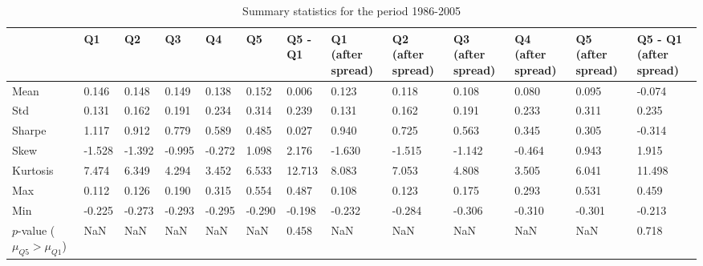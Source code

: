 \begin{table}
\caption{Summary statistics for the period 1986-2005}
\label{tab:summary_1986_2005}
\begin{tabular}{lllllllllllll}
\toprule
 & Q1 & Q2 & Q3 & Q4 & Q5 & Q5 - Q1 & Q1 (after spread) & Q2 (after spread) & Q3 (after spread) & Q4 (after spread) & Q5 (after spread) & Q5 - Q1 (after spread) \\
\midrule
Mean & 0.146 & 0.148 & 0.149 & 0.138 & 0.152 & 0.006 & 0.123 & 0.118 & 0.108 & 0.080 & 0.095 & -0.074 \\
Std & 0.131 & 0.162 & 0.191 & 0.234 & 0.314 & 0.239 & 0.131 & 0.162 & 0.191 & 0.233 & 0.311 & 0.235 \\
Sharpe & 1.117 & 0.912 & 0.779 & 0.589 & 0.485 & 0.027 & 0.940 & 0.725 & 0.563 & 0.345 & 0.305 & -0.314 \\
Skew & -1.528 & -1.392 & -0.995 & -0.272 & 1.098 & 2.176 & -1.630 & -1.515 & -1.142 & -0.464 & 0.943 & 1.915 \\
Kurtosis & 7.474 & 6.349 & 4.294 & 3.452 & 6.533 & 12.713 & 8.083 & 7.053 & 4.808 & 3.505 & 6.041 & 11.498 \\
Max & 0.112 & 0.126 & 0.190 & 0.315 & 0.554 & 0.487 & 0.108 & 0.123 & 0.175 & 0.293 & 0.531 & 0.459 \\
Min & -0.225 & -0.273 & -0.293 & -0.295 & -0.290 & -0.198 & -0.232 & -0.284 & -0.306 & -0.310 & -0.301 & -0.213 \\
$p$-value ($\mu_{Q5} > \mu_{Q1}$) & NaN & NaN & NaN & NaN & NaN & 0.458 & NaN & NaN & NaN & NaN & NaN & 0.718 \\
\bottomrule
\end{tabular}
\end{table}
